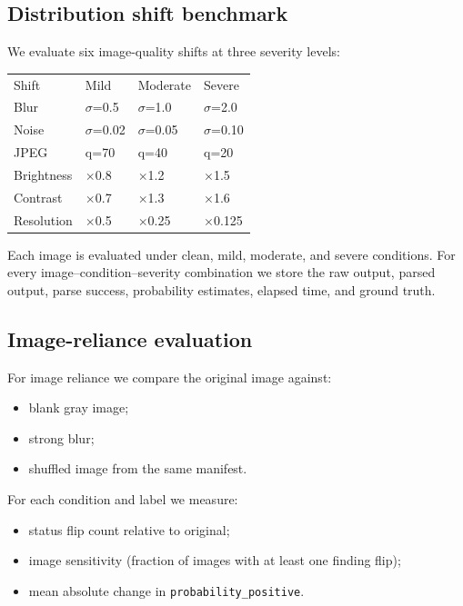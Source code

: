 \subsection{Distribution shift benchmark}

We evaluate six image-quality shifts at three severity levels:

\begin{table}[t]
\centering
\small
\begin{tabular}{llll}
\hline
Shift & Mild & Moderate & Severe \\
Blur & $\sigma$=0.5 & $\sigma$=1.0 & $\sigma$=2.0 \\
Noise & $\sigma$=0.02 & $\sigma$=0.05 & $\sigma$=0.10 \\
JPEG & q=70 & q=40 & q=20 \\
Brightness & $\times$0.8 & $\times$1.2 & $\times$1.5 \\
Contrast & $\times$0.7 & $\times$1.3 & $\times$1.6 \\
Resolution & $\times$0.5 & $\times$0.25 & $\times$0.125 \\
\hline
\end{tabular}
\end{table}


Each image is evaluated under clean, mild, moderate, and severe conditions. For every image--condition--severity combination we store the raw output, parsed output, parse success, probability estimates, elapsed time, and ground truth.

\subsection{Image-reliance evaluation}

For image reliance we compare the original image against:

\begin{itemize}
\item blank gray image;
\item strong blur;
\item shuffled image from the same manifest.
\end{itemize}

For each condition and label we measure:

\begin{itemize}
\item status flip count relative to original;
\item image sensitivity (fraction of images with at least one finding flip);
\item mean absolute change in \texttt{probability\_positive}.
\end{itemize}

